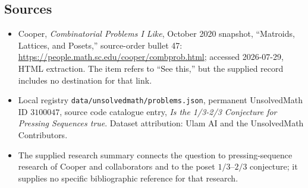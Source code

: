 \documentclass[11pt]{article}
\begin{document}
\subsection{Sources}
\begin{itemize}
\item Cooper, \emph{Combinatorial Problems I Like}, October 2020 snapshot, ``Matroids, Lattices, and Posets,'' source-order bullet 47: \url{https://people.math.sc.edu/cooper/combprob.html}; accessed 2026-07-29, HTML extraction. The item refers to ``See this,'' but the supplied record includes no destination for that link.
\item Local registry \texttt{data/unsolvedmath/problems.json}, permanent UnsolvedMath ID $3100047$, source code catalogue entry, \emph{Is the 1/3-2/3 Conjecture for Pressing Sequences true}. Dataset attribution: Ulam AI and the UnsolvedMath Contributors.
\item The supplied research summary connects the question to pressing-sequence research of Cooper and collaborators and to the poset $1/3$--$2/3$ conjecture; it supplies no specific bibliographic reference for that research.
\end{itemize}
\end{document}
